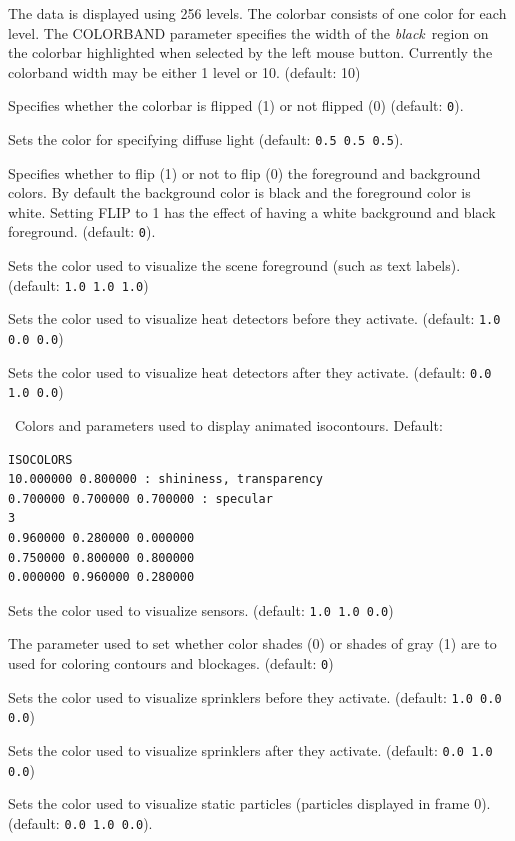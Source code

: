 \documentclass[11pt,twoside]{book}
\newcommand{\hitem}[1]{\item[{\bf #1} \hfill]}
\begin{document}
\hitem{COLORBAND} The data is displayed using 256 levels.
The colorbar consists of one color for each level.
The COLORBAND parameter specifies the width of the
{\em black}\ region on the colorbar highlighted
when selected by the left mouse button.
Currently the colorband width may be either 1 level or 10. (default: 10)

\hitem{COLORBARFLIP} Specifies whether the colorbar is flipped (1) or not flipped (0)
(default: {\tt 0}).
\hitem{DIFFUSELIGHT} Sets the color for specifying diffuse light (default: {\tt 0.5 0.5
0.5}).
\hitem{FLIP} Specifies whether to flip (1) or not to flip (0) the foreground and background
colors.  By default the background color is black and the foreground color
is white.  Setting FLIP to 1 has the effect of having a white background and black foreground.
(default: {\tt 0}).

\hitem{FOREGROUNDCOLOR}Sets the color used to visualize
the scene foreground (such as text labels).
(default: {\tt 1.0 1.0 1.0})

\hitem{HEATOFFCOLOR}Sets the color used to visualize
heat detectors before they activate.
(default: {\tt 1.0 0.0 0.0})

\hitem{HEATONCOLOR}Sets the color used to visualize
heat detectors after they activate.
(default: {\tt 0.0 1.0 0.0})


\hitem{ISOCOLORS}\ Colors and parameters used to display animated isocontours.
Default:
\begin{lstlisting}
ISOCOLORS
10.000000 0.800000 : shininess, transparency
0.700000 0.700000 0.700000 : specular
3
0.960000 0.280000 0.000000
0.750000 0.800000 0.800000
0.000000 0.960000 0.280000
\end{lstlisting}

\hitem{SENSORCOLOR}Sets the color used to visualize sensors.
(default: {\tt 1.0 1.0 0.0})

\hitem{SETBW}The parameter used to set whether color shades (0) or shades of gray (1)
are to used for coloring contours and blockages.
(default: {\tt 0})

\hitem{SPRINKOFFCOLOR}Sets the color used to visualize
sprinklers before they activate.
(default: {\tt 1.0 0.0 0.0})

\hitem{SPRINKONCOLOR}Sets the color used to visualize
sprinklers after they activate.
(default: {\tt 0.0 1.0 0.0})

\hitem{STATICPARTCOLOR}Sets the color used to visualize static particles (particles
displayed in frame 0).
 (default: {\tt 0.0 1.0 0.0}).
\end{document}
